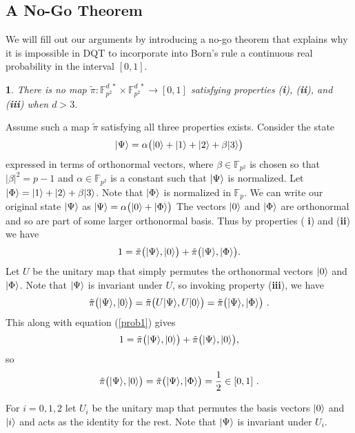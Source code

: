 \documentclass[english,12pt]{iopart}
\makeatletter
\theoremstyle{plain}
\newtheorem{thm}{\protect\theoremname}
\newenvironment{proof}[1][\protect\proofname]{\par
\normalfont\topsep6\p@\@plus6\p@\relax
\trivlist
\itemindent\parindent
\item[\hskip\labelsep\scshape #1]\ignorespaces
}{%
\endtrivlist\@endpefalse
}
\providecommand{\proofname}{Proof}
\newcommand{\ff}[1]{\mathbb{F}_{#1}}
\newcommand{\ffzd}[1]{{\mathbb{F}^{d\;*}_{#1}}}
\newcommand{\dpt}{{\tilde{\pi}}}
\providecommand{\theoremname}{Theorem}
\makeatother
\begin{document}
\subsection{\label{sub:A-No-Go-Theorem}A No-Go Theorem}

We will fill out our arguments by introducing a no-go theorem that
explains why it is impossible in DQT to incorporate into Born's rule a
continuous real probability in the interval $[0,1]$.

\begin{thm}
\label{theorem1} There is no map $\dpt\colon\ffzd{p^{2}}\times\ffzd{p^{2}}\longrightarrow[0,1]$
satisfying properties ({\bf i}), ({\bf ii}), and ({\bf iii})
when $d>3$. \end{thm}
%
\begin{proof}
Assume such a map $\dpt$ satisfying all three properties exists.
Consider the state 
\[
{\left\vert{\Psi}\right\rangle}=\alpha\big({\left\vert{0}\right\rangle}+{\left\vert{1}\right\rangle}+{\left\vert{2}\right\rangle}+\beta{\left\vert{3}\right\rangle}\big)
\]
expressed in terms of orthonormal vectors, where $\beta\in\ff{p^{2}}$
is chosen so that $\left|\beta\right|^{2}=p-1$ and $\alpha\in\ff{p^{2}}$
is a constant such that ${\left\vert{\Psi}\right\rangle}$ is normalized. Let ${\left\vert{\Phi}\right\rangle}={\left\vert{1}\right\rangle}+{\left\vert{2}\right\rangle}+\beta{\left\vert{3}\right\rangle}$.
Note that ${\left\vert{\Phi}\right\rangle}$ is normalized in $\ff{p}$. We can write our
original state ${\left\vert{\Psi}\right\rangle}$ as ${\left\vert{\Psi}\right\rangle}=\alpha\big({\left\vert{0}\right\rangle}+{\left\vert{\Phi}\right\rangle}\big)$
The vectors ${\left\vert{0}\right\rangle}$ and ${\left\vert{\Phi}\right\rangle}$ are orthonormal and so are
part of some larger orthonormal basis. Thus by properties ({\bf
i}) and ({\bf ii}) we have 
\begin{equation}
1=\dpt\big(\ket{\Psi},\ket{0}\big)+\dpt\big(\ket{\Psi},\ket{\Phi}\big).\label{prob1}
\end{equation}
Let $U$ be the unitary map that simply permutes the orthonormal vectors
${\left\vert{0}\right\rangle}$ and ${\left\vert{\Phi}\right\rangle}$. Note that ${\left\vert{\Psi}\right\rangle}$ is invariant
under $U$, so invoking property ({\bf iii}), we have 
\[
\dpt\big(\ket{\Psi},\ket{0}\big)=\dpt\big(U\ket{\Psi},U\ket{0}\big)=\dpt\big(\ket{\Psi},\ket{\Phi}\big)\ .
\]
This along with equation (\ref{prob1}) gives 
\[
1=\dpt\big(\ket{\Psi},\ket{0}\big)+\dpt\big(\ket{\Psi},\ket{0}\big),
\]
so 
\begin{equation}
\dpt\big(\ket{\Psi},\ket{0}\big)=\dpt\big(\ket{\Psi},\ket{\Phi}\big)=\frac{1}{2}\in[0,1]\ .\label{prob2}
\end{equation}
\par For $i=0,1,2$ let $U_{i}$ be the unitary map that permutes
the basis vectors ${\left\vert{0}\right\rangle}$ and ${\left\vert{i}\right\rangle}$ and acts as the identity
for the rest. Note that ${\left\vert{\Psi}\right\rangle}$ is invariant under $U_{i}$.

\end{proof}
\end{document}
